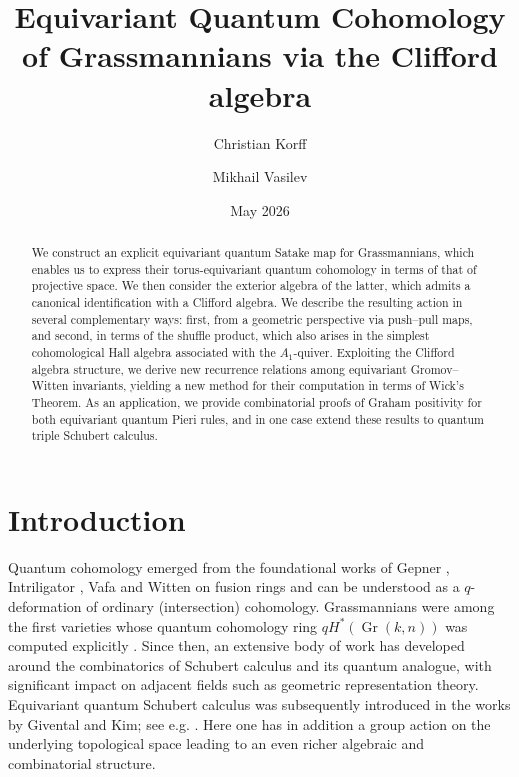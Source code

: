 \documentclass[12pt]{amsart}
\title[Equivariant Quantum Cohomology via the Clifford algebra]{Equivariant Quantum Cohomology of Grassmannians via the Clifford algebra}
\author{Christian Korff}
\author{Mikhail Vasilev}
\date{May 2026}
\newcommand{\op}[1]{\operatorname{#1}}
\numberwithin{equation}{section}
\numberwithin{figure}{section}
\begin{document}
\begin{abstract}
    We construct an explicit equivariant quantum Satake map for Grassmannians, which enables us to express their torus-equivariant quantum cohomology in terms of that of projective space. We then consider the exterior algebra of the latter, which admits a canonical identification with a Clifford algebra. We describe the resulting action in several complementary ways: first, from a geometric perspective via push–pull maps, and second, in terms of the shuffle product, which also arises in the simplest cohomological Hall algebra associated with the $A_1$-quiver. Exploiting the Clifford algebra structure, we derive new recurrence relations among equivariant Gromov–Witten invariants, yielding a new method for their computation in terms of Wick's Theorem. As an application, we provide combinatorial proofs of Graham positivity for both equivariant quantum Pieri rules, and in one case extend these results to quantum triple Schubert calculus.
\end{abstract}

\maketitle
\tableofcontents

\section{Introduction}

Quantum cohomology emerged from the foundational works of Gepner \cite{gepner1991fusion}, Intriligator \cite{intriligator1991fusion}, Vafa \cite{vafa1991topological} and Witten \cite{witten1993verlinde} on fusion rings and can be understood as a $q$-deformation of ordinary (intersection) cohomology. Grassmannians were among the first varieties whose quantum cohomology ring $qH^*(\op{Gr}(k,n))$ was computed explicitly \cite{agnihotri1995quantum, bertram1997quantum}. Since then, an extensive body of work has developed around the combinatorics of Schubert calculus and its quantum analogue, with significant impact on adjacent fields such as geometric representation theory. Equivariant quantum Schubert calculus was subsequently introduced in the works by Givental and Kim; see e.g. \cite{givental1995quantum,givental1996equivariant,kim1996equivariant}. Here one has in addition a group action on the underlying topological space leading to an even richer algebraic and combinatorial structure.
\end{document}
